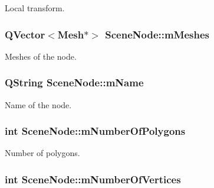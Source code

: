 Local transform. 

\hypertarget{class_scene_node_aced6fad8487c27dad0f6ee1d1ec80b90}{
\subsubsection[{m\+Meshes}]{\setlength{\rightskip}{0pt plus 5cm}Q\+Vector$<${\bf Mesh}$\ast$$>$ Scene\+Node\+::m\+Meshes\hspace{0.3cm}{\ttfamily [private]}}}\label{class_scene_node_aced6fad8487c27dad0f6ee1d1ec80b90}


Meshes of the node. 

\hypertarget{class_scene_node_ad362c98f40bfd634a446a8074081ca00}{
\subsubsection[{m\+Name}]{\setlength{\rightskip}{0pt plus 5cm}Q\+String Scene\+Node\+::m\+Name\hspace{0.3cm}{\ttfamily [private]}}}\label{class_scene_node_ad362c98f40bfd634a446a8074081ca00}


Name of the node. 

\hypertarget{class_scene_node_a212fad91b1eeb3aad793101d81c1ba3e}{
\subsubsection[{m\+Number\+Of\+Polygons}]{\setlength{\rightskip}{0pt plus 5cm}int Scene\+Node\+::m\+Number\+Of\+Polygons\hspace{0.3cm}{\ttfamily [private]}}}\label{class_scene_node_a212fad91b1eeb3aad793101d81c1ba3e}


Number of polygons. 

\hypertarget{class_scene_node_a7c740b28389775b5df3a5a37af990c35}{
\subsubsection[{m\+Number\+Of\+Vertices}]{\setlength{\rightskip}{0pt plus 5cm}int Scene\+Node\+::m\+Number\+Of\+Vertices\hspace{0.3cm}{\ttfamily [private]}}}\label{class_scene_node_a7c740b28389775b5df3a5a37af990c35}


